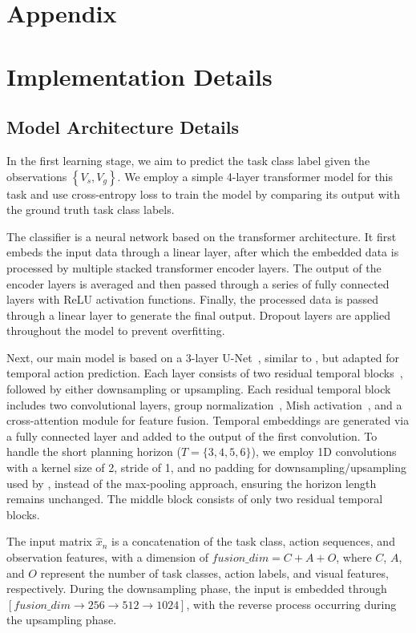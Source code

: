 \section*{Appendix}
\appendix
\section{Implementation Details}
\subsection{Model Architecture Details} 

In the first learning stage, we aim to predict the task class label given the observations $\left\{V_s, V_g\right\}$. We employ a simple 4-layer transformer model for this task and use cross-entropy loss to train the model by comparing its output with the ground truth task class labels.

The classifier is a neural network based on the transformer architecture. It first embeds the input data through a linear layer, after which the embedded data is processed by multiple stacked transformer encoder layers. The output of the encoder layers is averaged and then passed through a series of fully connected layers with ReLU activation functions. Finally, the processed data is passed through a linear layer to generate the final output. Dropout layers are applied throughout the model to prevent overfitting. 

Next, our main model is based on a 3-layer U-Net~\citep{ronneberger2015u}, similar to \citet{wang2023pdpp}, but adapted for temporal action prediction. Each layer consists of two residual temporal blocks~\citep{he2016deep}, followed by either downsampling or upsampling. Each residual temporal block includes two convolutional layers, group normalization~\citep{wu2018group}, Mish activation~\citep{misra2019mish}, and a cross-attention module for feature fusion. Temporal embeddings are generated via a fully connected layer and added to the output of the first convolution. To handle the short planning horizon ($T = \{3, 4, 5, 6\}$), we employ 1D convolutions with a kernel size of 2, stride of 1, and no padding for downsampling/upsampling used by \citet{wang2023pdpp}, instead of the max-pooling approach, ensuring the horizon length remains unchanged. The middle block consists of only two residual temporal blocks.

The input matrix $\hat{x}_n$ is a concatenation of the task class, action sequences, and observation features, with a dimension of $fusion\_dim = C + A + O$, where $C$, $A$, and $O$ represent the number of task classes, action labels, and visual features, respectively. During the downsampling phase, the input is embedded through $[fusion\_dim \to 256 \to 512 \to 1024]$, with the reverse process occurring during the upsampling phase.

